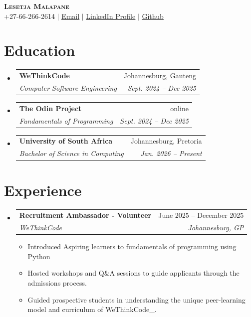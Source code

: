 \documentclass[letterpaper,11pt]{article}
\makeatletter
\newcommand{\resumeItem}[1]{
  \item\small{
    {#1 \vspace{-2pt}}
  }
}
\newcommand{\resumeSubheading}[4]{
  \vspace{-2pt}\item
    \begin{tabular*}{0.97\textwidth}[t]{l@{\extracolsep{\fill}}r}
      \textbf{#1} & #2 \\
      \textit{\small#3} & \textit{\small #4} \\
    \end{tabular*}\vspace{-7pt}
}
\newcommand{\resumeSubHeadingListStart}{\begin{itemize}[leftmargin=0.15in, label={}]}
\newcommand{\resumeSubHeadingListEnd}{\end{itemize}}
\newcommand{\resumeItemListStart}{\begin{itemize}}
\newcommand{\resumeItemListEnd}{\end{itemize}\vspace{-5pt}}
\makeatother
\begin{document}

\begin{center}
    \textbf{\Huge \scshape Lesetja Malapane} \\ \vspace{1pt}
    \small +27-66-266-2614 $|$ \href{mailto:kmalapane155@gmail.com}{\underline{Email}} $|$ 
    \href{https://www.linkedin.com/in/lesetjaa}{\underline{LinkedIn Profile}} $|$
    \href{https://github.com/lesetjaa}{\underline{Github}}
\end{center}


\section{Education}
  \resumeSubHeadingListStart
    \resumeSubheading
      {WeThinkCode}{Johannesburg, Gauteng}
      {Computer Software Engineering}{Sept. 2024 -- Dec 2025}

    \resumeSubheading
      {The Odin Project}{online}
      {Fundamentals of Programming}{Sept. 2024 -- Dec 2025}

  \resumeSubheading
      {University of South Africa}{Johannesburg, Pretoria}
      {Bachelor of Science in Computing}{Jan. 2026 -- Present}
  \resumeSubHeadingListEnd


\section{Experience}
  \resumeSubHeadingListStart

    \resumeSubheading
      {Recruitment Ambassador - Volunteer}{June 2025 -- December 2025}
      {WeThinkCode}{Johannesburg, GP}
      \resumeItemListStart
        \resumeItem{Introduced Aspiring learners to fundamentals of programming using Python}
        \resumeItem{Hosted workshops and Q\&A sessions to guide applicants through the admissions    process.}
        \resumeItem{Guided prospective students in understanding the unique peer-learning model     and curriculum of WeThinkCode\_.}
      \resumeItemListEnd
  \resumeSubHeadingListEnd
\end{document}
